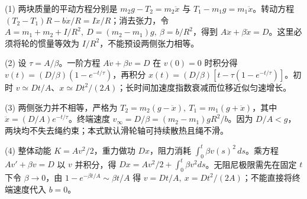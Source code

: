 (1) 两块质量的平动方程分别是 \(m_2g-T_2=m_2\ddot x\) 与 \(T_1-m_1g=m_1\ddot x\)。转动方程 \((T_2-T_1)R-b\dot x/R=I\ddot x/R\)；消去张力，令 \(A=m_1+m_2+I/R^2,\ D=(m_2-m_1)g,\ \beta=b/R^2\)，得到 \(A\ddot x+\beta\dot x=D\)。这里必须将轮的惯量等效为 \(I/R^2\)，不能预设两侧张力相等。

(2) 设 \(\tau=A/\beta\)。一阶方程 \(A\dot v+\beta v=D\) 在 \(v(0)=0\) 时积分得 \(v(t)=(D/\beta)(1-e^{-t/\tau})\)，再积分 \(x(t)=(D/\beta)[t-\tau(1-e^{-t/\tau})]\)。初时 \(v\simeq Dt/A\)、\(x\simeq Dt^2/(2A)\)；长时间加速度指数衰减而位移近似匀速增长。

(3) 两侧张力并不相等，严格为 \(T_2=m_2(g-\ddot x),\ T_1=m_1(g+\ddot x)\)，其中 \(\ddot x=(D/A)e^{-t/\tau}\)。终端速度 \(v_\infty=D/\beta=(m_2-m_1)gR^2/b\)。因为 \(D/A<g\)，两块均不失去绳约束；本式默认滑轮轴可持续散热且绳不滑。

(4) 整体动能 \(K=Av^2/2\)，重力做功 \(Dx\)，阻力消耗 \(\int_0^t\beta v(s)^2\,ds\)。乘方程 \(Av'+\beta v=D\) 以 \(v\) 并积分，得 \(Dx=Av^2/2+\int_0^t\beta v^2ds\)。无阻尼极限需先在固定 \(t\) 下令 \(\beta\to0\)，由 \(1-e^{-\beta t/A}\sim\beta t/A\) 得 \(v=Dt/A,\ x=Dt^2/(2A)\)；不能直接将终端速度代入 \(b=0\)。
